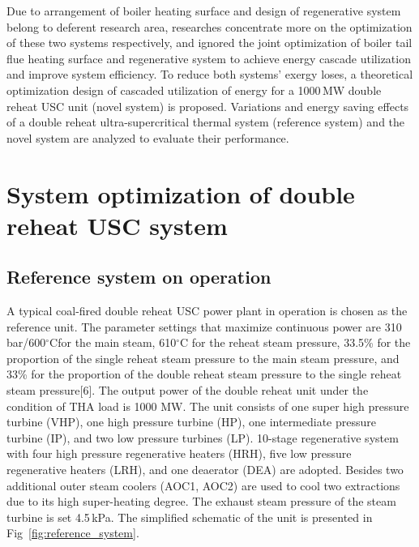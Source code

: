 \documentclass[preprint,12pt]{elsarticle}
\begin{document}
Due to arrangement of boiler heating surface and design of regenerative system belong to deferent research area, researches concentrate more on the optimization of these two systems respectively, and ignored the joint optimization of boiler tail flue heating surface and regenerative system to achieve energy cascade utilization and improve system efficiency.
To reduce both systems' exergy loses, a theoretical optimization design of cascaded utilization of energy for a 1000\,MW double reheat USC unit (novel system) is proposed. Variations and energy saving effects of a double reheat ultra-supercritical thermal system (reference system) and the novel system are analyzed to evaluate their performance. 
\section{System optimization of double reheat USC system}
\label{sec2:system intro}
\subsection{Reference system on operation} %
\label{sub2:ref intro}
A typical coal-fired double reheat USC power plant in operation is chosen as the reference unit.
The parameter settings that maximize continuous power are 310\,bar/600$^\circ$Cfor the main steam, 610$^\circ$C for the reheat steam pressure, 33.5\% for the proportion of the single reheat steam pressure to the main steam pressure, and 33\% for the proportion of the double reheat steam pressure to the single reheat steam pressure[6].
The output power of the double reheat unit under the condition of THA load is 1000 MW.
The unit consists of one super high pressure turbine (VHP), one high pressure turbine (HP), one intermediate pressure turbine (IP), and two low pressure turbines (LP).
10-stage regenerative system with four high pressure regenerative heaters (HRH), five low pressure regenerative heaters (LRH), and one deaerator (DEA) are adopted.
Besides two additional outer steam coolers (AOC1, AOC2) are used to cool two extractions due to its high super-heating degree. The exhaust steam pressure of the steam turbine is set 4.5\,kPa. The simplified schematic of the unit is presented in Fig~\ref{fig:reference_system}.
\end{document}
